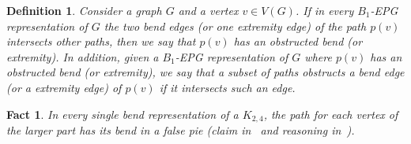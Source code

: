 \documentclass[preprint,12pt]{elsarticle} %
\newtheorem{defi}[theorem]{Definition}
\newtheorem{fact}[theorem]{Fact}
\begin{document}
\begin{defi}
Consider a graph $G$ and a vertex $v \in V(G)$. If in every $B_1$-EPG representation of $G$ the two bend edges (or one extremity edge) of the path $p(v)$ intersects other paths, then we say that $p(v)$ has an \emph{obstructed bend (or extremity)}. 
In addition, given a $B_1$-EPG representation of $G$ where $p(v)$ has an obstructed bend (or extremity), we say that a subset of paths \emph{obstructs} a bend edge (or a extremity edge) of $p(v)$ if it intersects such an edge. 




\end{defi}


\begin{fact} \label{fact:k24facts}
In every single bend representation of a $K_{2,4}$, the path for each vertex of the larger part has its bend in a false pie (claim in~\citep{daniel2014b} and reasoning in~\citep{Asinowski2009}).
\end{fact}
\end{document}
